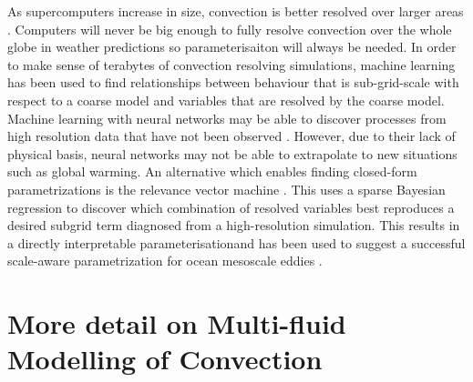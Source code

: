 \documentclass[11pt,a4paper]{article}
\begin{document}
As supercomputers increase in size, convection is better resolved over larger areas \cite[eg.][]{GC17}. Computers will never be big enough to fully resolve convection over the whole globe in weather predictions \cite[eg.][]{SSJ+19} so parameterisaiton will always be needed. In order to make sense of terabytes of convection resolving simulations, machine learning has been used to find relationships between behaviour that is sub-grid-scale with respect to a coarse model and variables that are resolved by the coarse model. Machine learning with neural networks may be able to discover processes from high resolution data that have not been observed \cite[eg.][]{ogorman2018}. However, due to their lack of physical basis, neural networks may not be able to extrapolate to new situations such as global warming. An alternative which enables finding closed-form parametrizations is the relevance vector machine \cite[]{tipping2001}. This uses a sparse Bayesian regression to discover which combination of resolved variables best reproduces a desired subgrid term diagnosed from a high-resolution simulation. This results in a directly interpretable parameterisationand has been used to suggest a successful scale-aware parametrization for ocean mesoscale eddies \cite[]{zanna2020}.

\section{More detail on Multi-fluid Modelling of Convection}
\label{sec:mf}
\end{document}

